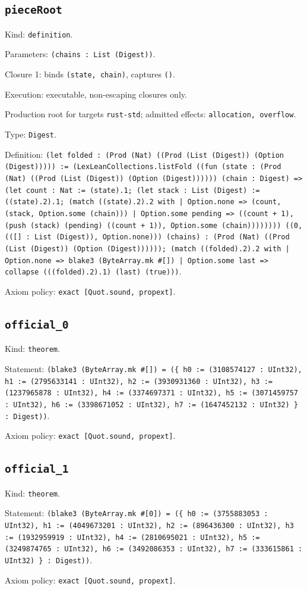 \documentclass[11pt]{article}
\begin{document}
\subsection*{\texttt{pieceRoot}}
\noindent Kind: \texttt{definition}.\par
\noindent Parameters: \texttt{(chains : List (Digest))}.\par
\noindent Closure 1: binds \texttt{(state, chain)}, captures \texttt{()}.\par
\noindent Execution: executable, non-escaping closures only.\par
\noindent Production root for targets \texttt{rust-std}; admitted effects: \texttt{allocation, overflow}.\par
\noindent Type: \texttt{Digest}.\par
\noindent Definition: \texttt{(let folded : (Prod (Nat) ((Prod (List (Digest)) (Option (Digest))))) := (LexLeanCollections.listFold ((fun (state : (Prod (Nat) ((Prod (List (Digest)) (Option (Digest)))))) (chain : Digest) => (let count : Nat := (state).1; (let stack : List (Digest) := ((state).2).1; (match ((state).2).2 with | Option.none => (count, (stack, Option.some (chain))) | Option.some pending => ((count + 1), (push (stack) (pending) ((count + 1)), Option.some (chain)))))))) ((0, (([] : List (Digest)), Option.none))) (chains) : (Prod (Nat) ((Prod (List (Digest)) (Option (Digest)))))); (match ((folded).2).2 with | Option.none => blake3 (ByteArray.mk \#[]) | Option.some last => collapse (((folded).2).1) (last) (true)))}.\par
\noindent Axiom policy: \texttt{exact [Quot.sound, propext]}.\par
\subsection*{\texttt{official\_0}}
\noindent Kind: \texttt{theorem}.\par
\noindent Statement: \texttt{(blake3 (ByteArray.mk \#[]) = (\{ h0 := (3108574127 : UInt32), h1 := (2795633141 : UInt32), h2 := (3930931360 : UInt32), h3 := (1237965878 : UInt32), h4 := (3374697371 : UInt32), h5 := (3071459757 : UInt32), h6 := (3398671052 : UInt32), h7 := (1647452132 : UInt32) \} : Digest))}.\par
\noindent Axiom policy: \texttt{exact [Quot.sound, propext]}.\par
\subsection*{\texttt{official\_1}}
\noindent Kind: \texttt{theorem}.\par
\noindent Statement: \texttt{(blake3 (ByteArray.mk \#[0]) = (\{ h0 := (3755883053 : UInt32), h1 := (4049673201 : UInt32), h2 := (896436300 : UInt32), h3 := (1932959919 : UInt32), h4 := (2810695021 : UInt32), h5 := (3249874765 : UInt32), h6 := (3492086353 : UInt32), h7 := (333615861 : UInt32) \} : Digest))}.\par
\noindent Axiom policy: \texttt{exact [Quot.sound, propext]}.\par
\end{document}

